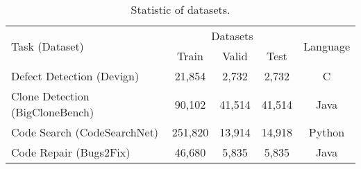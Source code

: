 \begin{table}[!t]
    \centering
    \tiny
    \tabcolsep=11pt
    \caption{Statistic of datasets.}
    
    \vspace{-2mm}
    \label{tab:statistic_of_datasets}
    \begin{tabular}{lcccc}
        \toprule
        
        \multirow{2}{*}[-1ex]{Task (Dataset)} & \multicolumn{3}{c}{Datasets} & \multirow{2}{*}[-1ex]{Language}\\

        \cmidrule(lr){2-4}
        
        & Train & Valid & Test & \\
    
        \midrule

        Defect Detection (Devign) & 21,854 & 2,732 & 2,732 & C \\

        Clone Detection (BigCloneBench) & 90,102 & 41,514 & 41,514 & Java \\

        Code Search (CodeSearchNet) & 251,820 & 13,914 & 14,918 & Python \\

        Code Repair (Bugs2Fix) & 46,680 & 5,835 & 5,835 & Java \\

        \bottomrule
    \end{tabular}
     \vspace{-4mm}
\end{table}

